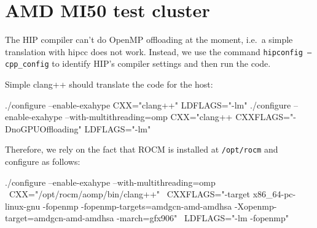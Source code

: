 \section{AMD MI50 test cluster}


The HIP compiler can't do OpenMP offloading at the moment, i.e.~a simple
translation with hipcc does not work. 
Instead, we use the command \texttt{hipconfig --cpp\_config} to identify HIP's
compiler settings and then run the code.


Simple clang++ should translate the code for the host:
\begin{code}
./configure --enable-exahype CXX="clang++" LDFLAGS="-lm" 
./configure --enable-exahype --with-multithreading=omp CXX="clang++ CXXFLAGS="-DnoGPUOffloading" LDFLAGS="-lm"
\end{code}




\noindent
Therefore, we rely on the fact that ROCM is installed at \texttt{/opt/rocm} and
configure as follows:

\begin{code}
./configure --enable-exahype --with-multithreading=omp \
 CXX="/opt/rocm/aomp/bin/clang++" \
 CXXFLAGS="-target x86_64-pc-linux-gnu -fopenmp -fopenmp-targets=amdgcn-amd-amdhsa -Xopenmp-target=amdgcn-amd-amdhsa -march=gfx906" \
 LDFLAGS="-lm -fopenmp"
\end{code}





